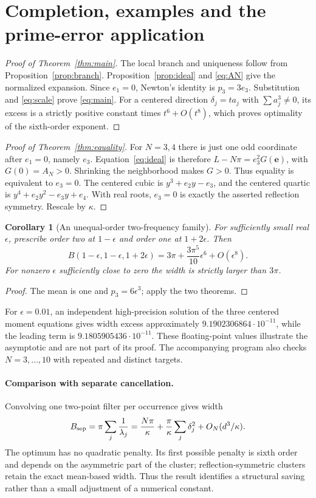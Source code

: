 \documentclass[11pt,a4paper]{article}
\newtheorem{corollary}[theorem]{Corollary}
\theoremstyle{remark}\newtheorem{remark}[theorem]{Remark}
\begin{document}
\section{Completion, examples and the prime-error application}
\begin{proof}[Proof of Theorem~\ref{thm:main}]
The local branch and uniqueness follow from Proposition~\ref{prop:branch}. Proposition~\ref{prop:ideal} and \eqref{eq:AN} give the normalized expansion. Since $e_1=0$, Newton's identity is $p_3=3e_3$. Substitution and \eqref{eq:scale} prove \eqref{eq:main}. For a centered direction $\delta_j=ta_j$ with $\sum a_j^3\ne0$, its excess is a strictly positive constant times $t^6+O(t^8)$, which proves optimality of the sixth-order exponent.
\end{proof}

\begin{proof}[Proof of Theorem~\ref{thm:equality}]
For $N=3,4$ there is just one odd coordinate after $e_1=0$, namely $e_3$. Equation~\eqref{eq:ideal} is therefore
$L-N\pi=e_3^2G(\boldsymbol e)$, with $G(0)=A_N>0$. Shrinking the neighborhood makes $G>0$. Thus equality is equivalent to $e_3=0$. The centered cubic is $y^3+e_2y-e_3$, and the centered quartic is $y^4+e_2y^2-e_3y+e_4$. With real roots, $e_3=0$ is exactly the asserted reflection symmetry. Rescale by $\kappa$.
\end{proof}

\begin{corollary}[An unequal-order two-frequency family]\label{cor:example}
For sufficiently small real $\epsilon$, prescribe order two at $1-\epsilon$ and order one at $1+2\epsilon$. Then
\[
 B(1-\epsilon,1-\epsilon,1+2\epsilon)
 =3\pi+\frac{3\pi^5}{10}\epsilon^6+O(\epsilon^8).
\]
For nonzero $\epsilon$ sufficiently close to zero the width is strictly larger than $3\pi$.
\end{corollary}
\begin{proof}
The mean is one and $p_3=6\epsilon^3$; apply the two theorems.
\end{proof}
For $\epsilon=0.01$, an independent high-precision solution of the three centered moment equations gives width excess approximately $9.1902306864\cdot10^{-11}$, while the leading term is $9.1805905436\cdot10^{-11}$. These floating-point values illustrate the asymptotic and are not part of its proof. The accompanying program also checks $N=3,\ldots,10$ with repeated and distinct targets.

\paragraph{Comparison with separate cancellation.}
Convolving one two-point filter per occurrence gives width
\[
 B_{\rm sep}=\pi\sum_j\frac1{\lambda_j}
 =\frac{N\pi}{\kappa}+\frac{\pi}{\kappa}\sum_j\delta_j^2+O_N(d^3/\kappa).
\]
The optimum has no quadratic penalty. Its first possible penalty is sixth order and depends on the asymmetric part of the cluster; reflection-symmetric clusters retain the exact mean-based width. Thus the result identifies a structural saving rather than a small adjustment of a numerical constant.
\end{document}
